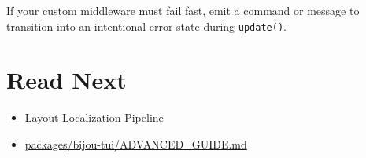If your custom middleware must fail fast, emit a command or message to transition into an intentional error state during \texttt{u\allowbreak{}p\allowbreak{}d\allowbreak{}a\allowbreak{}t\allowbreak{}e\allowbreak{}(\allowbreak{})}.

\section{Read Next}\label{record-014-read-next}

\begin{itemize}
\tightlist
\item
  \href{https://github.com/flyingrobots/bijou/blob/cbd70612140e7a450d764b3c7be1c6af878b99bc/docs/strategy/layout-localization-pipeline.md}{Layout Localization Pipeline}
\item
  \href{https://github.com/flyingrobots/bijou/blob/cbd70612140e7a450d764b3c7be1c6af878b99bc/packages/bijou-tui/ADVANCED_GUIDE.md}{packages/bijou-tui/ADVANCED\_GUIDE.md}
\end{itemize}

